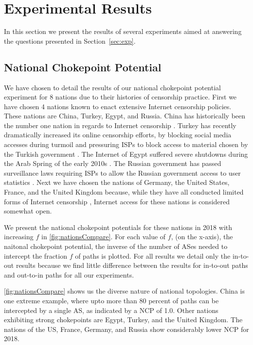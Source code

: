 \section{Experimental Results}

In this section we present the results of several experiments aimed at
answering the questions presented in Section~\ref{sec:exp}. 

\subsection{National Chokepoint Potential} 

	We have chosen to detail the results of our national chokepoint potential
experiment for 8 nations due to
their histories of censorship practice. First we have chosen 4 nations known to
enact extensive Internet censorship policies. These nations are China, Turkey,
Egypt, and Russia. China has historically been the number one nation in regards
to Internet censorship \cite{censorshipSurvey}. Turkey has recently
dramatically increased its online censorship efforts, by blocking social media
accesses during turmoil and pressuring ISPs to block access to material chosen
by the Turkish government \cite{turkeyCensor}. The Internet of Egypt suffered
severe shutdowns during the Arab Spring of the early 2010s \cite{arabspring}.
The Russian government has passed surveillance laws requiring ISPs to allow the
Russian government access to user statistics \cite{censorshipGeography}. Next
we have chosen the nations of Germany, the United States, France, and the
United Kingdom because, while they have all conducted limited forms of Internet
censorship \cite{censorshipSurvey}, Internet access for these nations is
considered somewhat open.
	
We present the national chokepoint potentials for these nations in 2018 with increasing
$f$ in \figurename \ref{fig:nationsCompare}. For each value of $f$, (on the x-axis),
the naitonal chokepoint potential, the inverse of the number of ASes needed to intercept
the fraction $f$ of paths is plotted. For all results we detail only the in-to-out results
because we find little difference between the results for in-to-out paths and out-to-in paths
for all our experiments.

\figurename \ref{fig:nationsCompare} shows us the diverse nature of national topologies. China is one
extreme example, where upto more than 80 percent of paths can be intercepted by a single AS, as indicated
by a NCP of 1.0. Other nations exhibiting strong chokepoints are Egypt, Turkey, and the United Kingdom. The
nations of the US, France, Germany, and Russia show considerably lower NCP for 2018.

